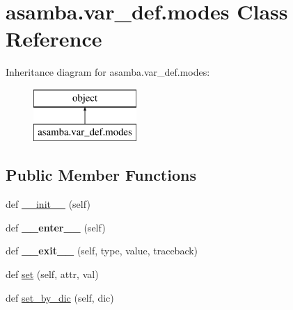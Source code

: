\hypertarget{classasamba_1_1var__def_1_1modes}{}\section{asamba.\+var\+\_\+def.\+modes Class Reference}
\label{classasamba_1_1var__def_1_1modes}
Inheritance diagram for asamba.\+var\+\_\+def.\+modes\+:\begin{figure}[H]
\begin{center}
\leavevmode
\includegraphics[height=2.000000cm]{classasamba_1_1var__def_1_1modes}
\end{center}
\end{figure}
\subsection*{Public Member Functions}
\begin{DoxyCompactItemize}
\item 
def \hyperlink{classasamba_1_1var__def_1_1modes_a3e7e2e2e01dadeb07002bde1f8e35ac9}{\+\_\+\+\_\+init\+\_\+\+\_\+} (self)
\item 
\mbox{\label{classasamba_1_1var__def_1_1modes_ae15778f02288da4abc131dfd5d0af151}} 
def {\bfseries \+\_\+\+\_\+enter\+\_\+\+\_\+} (self)
\item 
\mbox{\label{classasamba_1_1var__def_1_1modes_a928762de62f113e943da5a711c546397}} 
def {\bfseries \+\_\+\+\_\+exit\+\_\+\+\_\+} (self, type, value, traceback)
\item 
def \hyperlink{classasamba_1_1var__def_1_1modes_a68e3175f54a123a371a9e5345b2cfe6e}{set} (self, attr, val)
\item 
def \hyperlink{classasamba_1_1var__def_1_1modes_a2d9b87e9cdfe54142627a502476bb868}{set\+\_\+by\+\_\+dic} (self, dic)
\end{DoxyCompactItemize}

